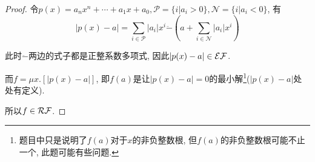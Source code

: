 \begin{proof}
    令$p(x)=a_nx^n+\cdots+a_1x+a_0, \mathcal{P}=\{i|a_i>0\}, \mathcal{N}=\{i|a_i<0\}$, 有
    $$|p(x)-a|=\sum_{i\in\mathcal{P}} |a_i|x^i \ddot{-} \left(a+\sum_{i\in\mathcal{N}} |a_i|x^i\right)$$
	
    此时$\ddot{-}$两边的式子都是正整系数多项式, 因此$|p(x)-a|\in\mathcal{EF}$.

    而$f=\mu x.[|p(x)-a|]$, 即$f(a)$是让$|p(x)-a|=0$的最小解\footnote{题目中只是说明了$f(a)$对于$x$的非负整数根, 但$f(a)$的非负整数根可能不止一个, 此题可能有些问题.}($|p(x)-a|$处处有定义).

    所以$f\in\mathcal{RF}$.
\end{proof}